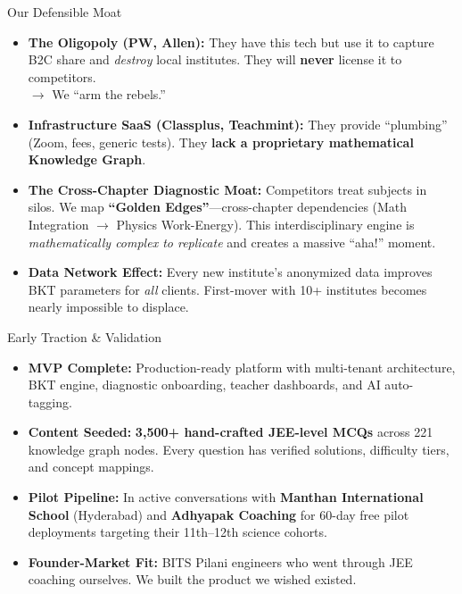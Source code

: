 \documentclass[aspectratio=169, 10pt]{beamer}
\begin{document}
\begin{frame}{Our Defensible Moat}
  \small
  \begin{itemize}
    \setlength\itemsep{0.5em}
    \item \textbf{\textcolor{LearnRed}{The Oligopoly} (PW, Allen):} They have this tech but use it to capture B2C share and \emph{destroy} local institutes. They will \textbf{never} license it to competitors.\\[0.2em]
    \hspace{1em}\textcolor{LearnBlue}{$\rightarrow$ We ``arm the rebels.''}

    \item \textbf{\textcolor{LearnYellow}{Infrastructure SaaS} (Classplus, Teachmint):} They provide ``plumbing'' (Zoom, fees, generic tests). They \textbf{lack a proprietary mathematical Knowledge Graph}.

    \item \textbf{\textcolor{LearnGreen}{The Cross-Chapter Diagnostic Moat:}} Competitors treat subjects in silos. We map \textbf{``Golden Edges''}---cross-chapter dependencies (Math Integration $\rightarrow$ Physics Work-Energy). This interdisciplinary engine is \emph{mathematically complex to replicate} and creates a massive ``aha!'' moment.

    \item \textbf{\textcolor{LearnBlue}{Data Network Effect:}} Every new institute's anonymized data improves BKT parameters for \emph{all} clients. First-mover with 10+ institutes becomes nearly impossible to displace.
  \end{itemize}
\end{frame}

\begin{frame}{Early Traction \& Validation}
  \begin{itemize}
    \setlength\itemsep{0.6em}
    \item \textbf{MVP Complete:} Production-ready platform with multi-tenant architecture, BKT engine, diagnostic onboarding, teacher dashboards, and AI auto-tagging.

    \item \textbf{Content Seeded:} \textbf{3{,}500+ hand-crafted JEE-level MCQs} across 221 knowledge graph nodes. Every question has verified solutions, difficulty tiers, and concept mappings.

    \item \textbf{Pilot Pipeline:} In active conversations with \textbf{Manthan International School} (Hyderabad) and \textbf{Adhyapak Coaching} for 60-day free pilot deployments targeting their 11th--12th science cohorts.

    \item \textbf{Founder-Market Fit:} BITS Pilani engineers who went through JEE coaching ourselves. We built the product we wished existed.
  \end{itemize}
\end{frame}
\end{document}
